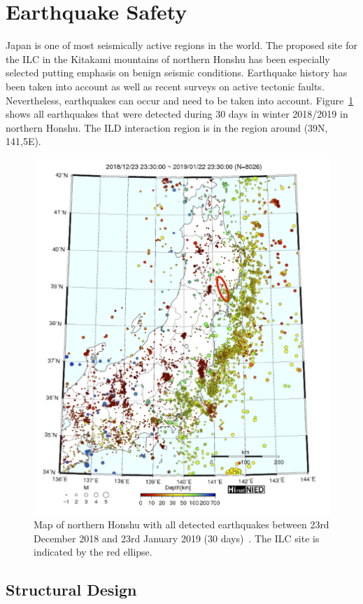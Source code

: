 \section{Earthquake Safety}
Japan is one of most seismically active regions in the world. The proposed site for the ILC in the Kitakami mountains of northern Honshu has been especially selected putting emphasis on benign seismic conditions. Earthquake history has been taken into account as well as recent surveys on active tectonic faults. Nevertheless, earthquakes can occur and need to be taken into account. Figure~\ref{ild:fig:integration:earthquake_map} shows all earthquakes that were detected during 30 days in winter 2018/2019 in northern Honshu. The ILD interaction region is in the region around (39N, 141,5E).

\begin{figure}[h!]
\centering
\includegraphics[width=0.8\hsize]{Integration/fig/earthquake_map.png}

\caption{\label{ild:fig:integration:earthquake_map}Map of northern Honshu with all detected earthquakes between 23rd December 2018 and 23rd January 2019 (30 days)~\cite{ild:bib:hi-net}. The ILC site is indicated by the red ellipse.}
\end{figure}

\subsection{Structural Design}

